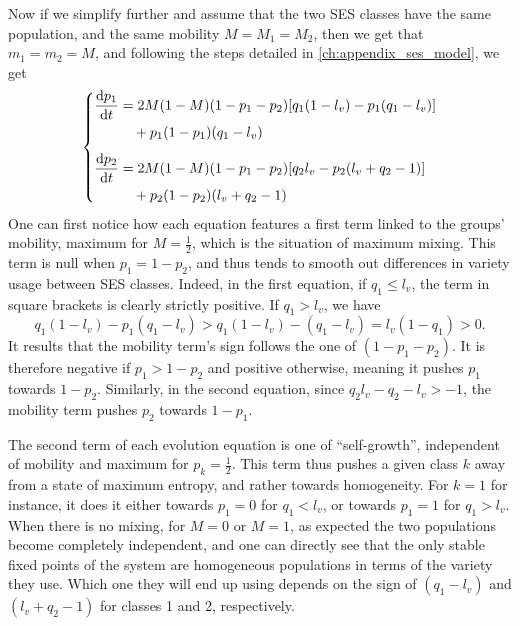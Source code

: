 \documentclass[../thesis.tex]{subfiles}
\begin{document}
Now if we simplify further and assume that the two \ac{SES} classes have the same
population, and the same mobility $M = M_1 = M_2$, then we get that $m_1 = m_2 = M$, and
following the steps detailed in \cref{ch:appendix_ses_model}, we get
\begin{equation}
  \label{eq:ses_ling_time_evol_eq_mob}
  \left\{
  \begin{aligned}
      \dv{p_1}{t} 
          &=
            2 M (1 - M) (1 - p_1 - p_2) [q_1 (1 - l_v) - p_1 (q_1 - l_v)]
      \\
          & \quad +
            p_1 (1 - p_1) (q_1 - l_v)
      \\[1ex]
      \dv{p_2}{t} 
          &=
            2 M (1 - M) (1 - p_1 - p_2) [q_2 l_v - p_2 (l_v + q_2 - 1)]
      \\
          & \quad +
            p_2 (1 - p_2) (l_v + q_2 - 1)
  \end{aligned}
  \right.
\end{equation}
One can first notice how each equation features a first term linked to the groups'
mobility, maximum for $M = \frac{1}{2}$, which is the situation of maximum mixing. This
term is null when $p_1 = 1 - p_2$, and thus tends to smooth out differences in variety
usage between \ac{SES} classes. Indeed, in the first equation, if $q_1 \leq l_v$, the
term in square brackets is clearly strictly positive. If $q_1 > l_v$, we have
\begin{equation}
  q_1 (1 - l_v) - p_1 (q_1 - l_v) > q_1 (1 - l_v) - (q_1 - l_v) = l_v (1 - q_1) > 0.
\end{equation}
It results that the mobility term's sign follows the one of $(1 - p_1 - p_2)$. It is
therefore negative if $p_1 > 1 - p_2$ and positive otherwise, meaning it pushes $p_1$
towards $1 - p_2$. Similarly, in the second equation, since $q_2 l_v - q_2 - l_v > -1$,
the mobility term pushes $p_2$ towards $1 - p_1$.

The second term of each evolution equation is one of ``self-growth'', independent of
mobility and maximum for $p_k = \frac{1}{2}$. This term thus pushes a given class $k$
away from a state of maximum entropy, and rather towards homogeneity. For $k = 1$ for
instance, it does it either towards $p_1 = 0$ for $q_1 < l_v$, or towards $p_1 = 1$ for
$q_1 > l_v$. When there is no mixing, for $M = 0$ or $M = 1$, as expected the two
populations become completely independent, and one can directly see that the only stable
fixed points of the system are homogeneous populations in terms of the variety they use.
Which one they will end up using depends on the sign of $(q_1 - l_v)$ and $(l_v + q_2 -
1)$ for classes 1 and 2, respectively.
\end{document}
